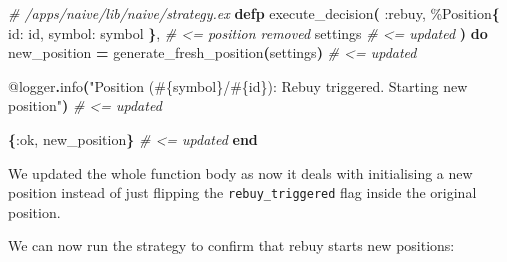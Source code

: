 \documentclass[
  oneside]{book}
\newenvironment{Shaded}{\begin{snugshade}}{\end{snugshade}}
\newcommand{\AttributeTok}[1]{\textcolor[rgb]{0.13,0.29,0.53}{#1}}
\newcommand{\BuiltInTok}[1]{#1}
\newcommand{\CommentTok}[1]{\textcolor[rgb]{0.56,0.35,0.01}{\textit{#1}}}
\newcommand{\ConstantTok}[1]{\textcolor[rgb]{0.56,0.35,0.01}{#1}}
\newcommand{\ErrorTok}[1]{\textcolor[rgb]{0.64,0.00,0.00}{\textbf{#1}}}
\newcommand{\ExtensionTok}[1]{#1}
\newcommand{\FunctionTok}[1]{\textcolor[rgb]{0.13,0.29,0.53}{\textbf{#1}}}
\newcommand{\KeywordTok}[1]{\textcolor[rgb]{0.13,0.29,0.53}{\textbf{#1}}}
\newcommand{\NormalTok}[1]{#1}
\newcommand{\OperatorTok}[1]{\textcolor[rgb]{0.81,0.36,0.00}{\textbf{#1}}}
\newcommand{\OtherTok}[1]{\textcolor[rgb]{0.56,0.35,0.01}{#1}}
\newcommand{\PreprocessorTok}[1]{\textcolor[rgb]{0.56,0.35,0.01}{\textit{#1}}}
\newcommand{\SpecialStringTok}[1]{\textcolor[rgb]{0.31,0.60,0.02}{#1}}
\newcommand{\StringTok}[1]{\textcolor[rgb]{0.31,0.60,0.02}{#1}}
\newcommand{\VariableTok}[1]{\textcolor[rgb]{0.00,0.00,0.00}{#1}}
\begin{document}
\begin{Shaded}
\begin{Highlighting}[]
  \CommentTok{\# /apps/naive/lib/naive/strategy.ex}
  \KeywordTok{defp}\NormalTok{ execute\_decision}\FunctionTok{(}
         \VariableTok{:rebuy}\NormalTok{,}
\NormalTok{         \%}\ConstantTok{Position}\FunctionTok{\{}
           \VariableTok{id:}\NormalTok{ id,}
           \VariableTok{symbol:}\NormalTok{ symbol}
         \FunctionTok{\}}\NormalTok{, }\CommentTok{\# \textless{}= position removed}
\NormalTok{         settings }\CommentTok{\# \textless{}= updated}
       \FunctionTok{)} \KeywordTok{do}
\NormalTok{    new\_position }\OperatorTok{=}\NormalTok{ generate\_fresh\_position}\FunctionTok{(}\NormalTok{settings}\FunctionTok{)} \CommentTok{\# \textless{}= updated}

    \OtherTok{@logger}\OperatorTok{.}\NormalTok{info}\FunctionTok{(}\StringTok{"Position (}\OtherTok{\#\{}\NormalTok{symbol}\OtherTok{\}}\StringTok{/}\OtherTok{\#\{}\NormalTok{id}\OtherTok{\}}\StringTok{): Rebuy triggered. Starting new position"}\FunctionTok{)} \CommentTok{\# \textless{}= updated}

    \FunctionTok{\{}\VariableTok{:ok}\NormalTok{, new\_position}\FunctionTok{\}} \CommentTok{\# \textless{}= updated}
  \KeywordTok{end}
\end{Highlighting}
\end{Shaded}

We updated the whole function body as now it deals with initialising a new position instead of just flipping the \texttt{rebuy\_triggered} flag inside the original position.

\newpage

We can now run the strategy to confirm that rebuy starts new positions:

\begin{Shaded}
\end{Shaded}
\end{document}
